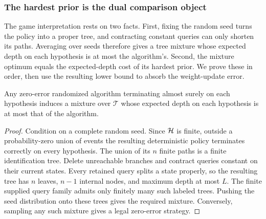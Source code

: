 \subsubsection{The hardest prior is the dual comparison object}

The game interpretation rests on two facts. First, fixing the random
seed turns the policy into a proper tree, and contracting constant
queries can only shorten its paths. Averaging over seeds therefore
gives a tree mixture whose expected depth on each hypothesis is at most
the algorithm's. Second, the mixture optimum equals the expected-depth
cost of its hardest prior. We prove these in order, then use the resulting
lower bound to absorb the weight-update error.

\begin{claim}
\label{clm:randomized-seed-mixture}
Any zero-error randomized algorithm terminating almost surely on each
hypothesis induces a mixture over $\mathcal T$ whose expected depth on
each hypothesis is at most that of the algorithm.
\end{claim}
\begin{proof}
Condition on a complete random seed. Since $\mathcal H$ is finite, outside
a probability-zero union of events the resulting deterministic
policy terminates correctly on every hypothesis. The union of its
$n$ finite paths is a finite identification tree. Delete unreachable
branches and contract queries constant on their current states.
Every retained query splits a state properly, so the resulting tree
has $n$ leaves, $n-1$ internal nodes, and maximum depth at most $L$.
The finite supplied query family admits only finitely many such
labeled trees. Pushing the seed distribution onto these trees gives
the required mixture. Conversely, sampling any such mixture gives
a legal zero-error strategy.
\end{proof}

